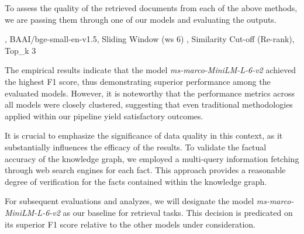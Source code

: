 To assess the quality of the retrieved documents from each of the above methods, we are passing them through one of our models and evaluating the outputs.

\begin{table}[h!]
    \centering
    \noindent
    {\scriptsize {}, BAAI/bge-small-en-v1.5, Sliding Window (ws 6) , Similarity Cut-off (Re-rank), Top\_k 3}
    \caption{Evaluation Results for Different Methods through the Pipeline (just with the Gemma2 model)}
    \label{tab:evaluation_results}
\end{table}

The empirical results indicate that the model \textit{ms-marco-MiniLM-L-6-v2} achieved the highest F1 score, thus demonstrating superior performance among the evaluated models.
However, it is noteworthy that the performance metrics across all models were closely clustered, suggesting that even traditional methodologies applied within our pipeline yield satisfactory outcomes.

It is crucial to emphasize the significance of data quality in this context, as it substantially influences the efficacy of the results.
To validate the factual accuracy of the knowledge graph, we employed a multi-query information fetching through web search engines for each fact.
This approach provides a reasonable degree of verification for the facts contained within the knowledge graph.

For subsequent evaluations and analyzes, we will designate the model \textit{ms-marco-MiniLM-L-6-v2} as our baseline for retrieval tasks.
This decision is predicated on its superior F1 score relative to the other models under consideration.


